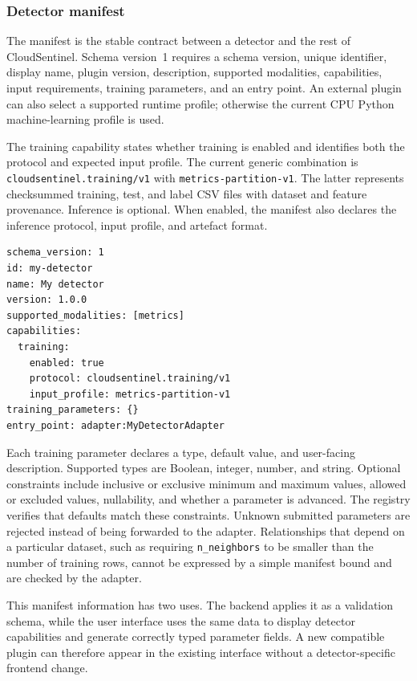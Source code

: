 \subsubsection{Detector manifest}

The manifest is the stable contract between a detector and the rest of CloudSentinel. Schema version~1 requires a schema version, unique identifier, display name, plugin version, description, supported modalities, capabilities, input requirements, training parameters, and an entry point. An external plugin can also select a supported runtime profile; otherwise the current CPU Python machine-learning profile is used.

The training capability states whether training is enabled and identifies both the protocol and expected input profile. The current generic combination is \texttt{cloudsentinel.training/v1} with \texttt{metrics-partition-v1}. The latter represents checksummed training, test, and label CSV files with dataset and feature provenance. Inference is optional. When enabled, the manifest also declares the inference protocol, input profile, and artefact format.

\begin{verbatim}
schema_version: 1
id: my-detector
name: My detector
version: 1.0.0
supported_modalities: [metrics]
capabilities:
  training:
    enabled: true
    protocol: cloudsentinel.training/v1
    input_profile: metrics-partition-v1
training_parameters: {}
entry_point: adapter:MyDetectorAdapter
\end{verbatim}

Each training parameter declares a type, default value, and user-facing description. Supported types are Boolean, integer, number, and string. Optional constraints include inclusive or exclusive minimum and maximum values, allowed or excluded values, nullability, and whether a parameter is advanced. The registry verifies that defaults match these constraints. Unknown submitted parameters are rejected instead of being forwarded to the adapter. Relationships that depend on a particular dataset, such as requiring \texttt{n\_neighbors} to be smaller than the number of training rows, cannot be expressed by a simple manifest bound and are checked by the adapter.

This manifest information has two uses. The backend applies it as a validation schema, while the user interface uses the same data to display detector capabilities and generate correctly typed parameter fields. A new compatible plugin can therefore appear in the existing interface without a detector-specific frontend change.

